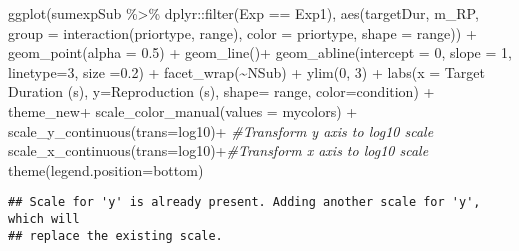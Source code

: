 \documentclass[
]{article}
\newenvironment{Shaded}{\begin{snugshade}}{\end{snugshade}}
\newcommand{\AttributeTok}[1]{\textcolor[rgb]{0.77,0.63,0.00}{#1}}
\newcommand{\CommentTok}[1]{\textcolor[rgb]{0.56,0.35,0.01}{\textit{#1}}}
\newcommand{\DecValTok}[1]{\textcolor[rgb]{0.00,0.00,0.81}{#1}}
\newcommand{\FloatTok}[1]{\textcolor[rgb]{0.00,0.00,0.81}{#1}}
\newcommand{\FunctionTok}[1]{\textcolor[rgb]{0.00,0.00,0.00}{#1}}
\newcommand{\NormalTok}[1]{#1}
\newcommand{\SpecialCharTok}[1]{\textcolor[rgb]{0.00,0.00,0.00}{#1}}
\newcommand{\StringTok}[1]{\textcolor[rgb]{0.31,0.60,0.02}{#1}}
\begin{document}
\begin{Shaded}
\begin{Highlighting}[]
\FunctionTok{ggplot}\NormalTok{(sumexpSub }\SpecialCharTok{\%\textgreater{}\%}\NormalTok{ dplyr}\SpecialCharTok{::}\FunctionTok{filter}\NormalTok{(Exp }\SpecialCharTok{==} \StringTok{\textquotesingle{}Exp1\textquotesingle{}}\NormalTok{), }\FunctionTok{aes}\NormalTok{(targetDur, m\_RP, }\AttributeTok{group =} \FunctionTok{interaction}\NormalTok{(priortype, range), }\AttributeTok{color =}\NormalTok{ priortype, }\AttributeTok{shape =}\NormalTok{ range)) }\SpecialCharTok{+} 
  \FunctionTok{geom\_point}\NormalTok{(}\AttributeTok{alpha =} \FloatTok{0.5}\NormalTok{) }\SpecialCharTok{+}
  \FunctionTok{geom\_line}\NormalTok{()}\SpecialCharTok{+}
  \FunctionTok{geom\_abline}\NormalTok{(}\AttributeTok{intercept =} \DecValTok{0}\NormalTok{, }\AttributeTok{slope =} \DecValTok{1}\NormalTok{, }\AttributeTok{linetype=}\DecValTok{3}\NormalTok{, }\AttributeTok{size =}\FloatTok{0.2}\NormalTok{) }\SpecialCharTok{+}
  \FunctionTok{facet\_wrap}\NormalTok{(}\SpecialCharTok{\textasciitilde{}}\NormalTok{NSub) }\SpecialCharTok{+}
  \FunctionTok{ylim}\NormalTok{(}\DecValTok{0}\NormalTok{, }\DecValTok{3}\NormalTok{) }\SpecialCharTok{+}
  \FunctionTok{labs}\NormalTok{(}\AttributeTok{x =} \StringTok{\textquotesingle{}Target Duration (s)\textquotesingle{}}\NormalTok{, }\AttributeTok{y=}\StringTok{\textquotesingle{}Reproduction (s)\textquotesingle{}}\NormalTok{,  }\AttributeTok{shape=} \StringTok{\textquotesingle{}range\textquotesingle{}}\NormalTok{, }\AttributeTok{color=}\StringTok{\textquotesingle{}condition\textquotesingle{}}\NormalTok{) }\SpecialCharTok{+} 
\NormalTok{  theme\_new}\SpecialCharTok{+}
  \FunctionTok{scale\_color\_manual}\NormalTok{(}\AttributeTok{values =}\NormalTok{ mycolors) }\SpecialCharTok{+}
  \FunctionTok{scale\_y\_continuous}\NormalTok{(}\AttributeTok{trans=}\StringTok{\textquotesingle{}log10\textquotesingle{}}\NormalTok{)}\SpecialCharTok{+} \CommentTok{\#Transform y axis to log10 scale}
  \FunctionTok{scale\_x\_continuous}\NormalTok{(}\AttributeTok{trans=}\StringTok{\textquotesingle{}log10\textquotesingle{}}\NormalTok{)}\SpecialCharTok{+}\CommentTok{\#Transform x axis to log10 scale}
  \FunctionTok{theme}\NormalTok{(}\AttributeTok{legend.position=}\StringTok{\textquotesingle{}bottom\textquotesingle{}}\NormalTok{)}
\end{Highlighting}
\end{Shaded}

\begin{verbatim}
## Scale for 'y' is already present. Adding another scale for 'y', which will
## replace the existing scale.
\end{verbatim}
\end{document}
